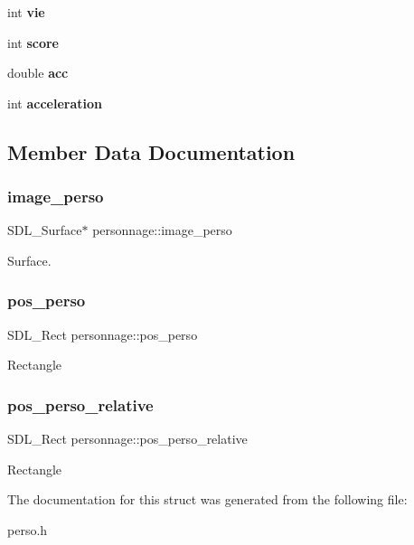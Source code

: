 \begin{DoxyCompactItemize}
int {\bfseries vie}
\item 
\mbox{\label{structpersonnage_af36f152bd0d5da298cf6ebca6c566e79}} 
int {\bfseries score}
\item 
\mbox{\label{structpersonnage_a73b28615341c5003ce52f5ac6b759111}} 
double {\bfseries acc}
\item 
\mbox{\label{structpersonnage_ad149509f75e8aff1950b313aab0d7888}} 
int {\bfseries acceleration}
\end{DoxyCompactItemize}


\subsection{Member Data Documentation}
\mbox{\label{structpersonnage_a791093b3684860157a3c156fe8bed344}} 
\subsubsection{\texorpdfstring{image\+\_\+perso}{image\_perso}}
{\footnotesize\ttfamily S\+D\+L\+\_\+\+Surface$\ast$ personnage\+::image\+\_\+perso}

Surface. \mbox{\label{structpersonnage_ae463b597df9edc784f3d4e0ec1e4cb01}} 
\subsubsection{\texorpdfstring{pos\+\_\+perso}{pos\_perso}}
{\footnotesize\ttfamily S\+D\+L\+\_\+\+Rect personnage\+::pos\+\_\+perso}

Rectangle \mbox{\label{structpersonnage_af5e96572fb204c5b7b8f8c65df786c11}} 
\subsubsection{\texorpdfstring{pos\+\_\+perso\+\_\+relative}{pos\_perso\_relative}}
{\footnotesize\ttfamily S\+D\+L\+\_\+\+Rect personnage\+::pos\+\_\+perso\+\_\+relative}

Rectangle 

The documentation for this struct was generated from the following file\+:\begin{DoxyCompactItemize}
\item 
perso.\+h\end{DoxyCompactItemize}
